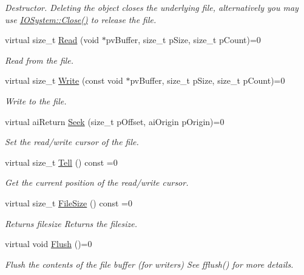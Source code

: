 \begin{DoxyCompactItemize}
\begin{DoxyCompactList}\small\item\em \-Destructor. \-Deleting the object closes the underlying file, alternatively you may use \hyperlink{classAssimp_1_1IOSystem_a8c334d60f04bceeb6bd0157d21723f3e}{\-I\-O\-System\-::\-Close()} to release the file. \end{DoxyCompactList}\item 
virtual size\-\_\-t \hyperlink{classAssimp_1_1IOStream_ae376f641020989d61863b9c6f55c7abf}{\-Read} (void $\ast$pv\-Buffer, size\-\_\-t p\-Size, size\-\_\-t p\-Count)=0
\begin{DoxyCompactList}\small\item\em \-Read from the file. \end{DoxyCompactList}\item 
virtual size\-\_\-t \hyperlink{classAssimp_1_1IOStream_ad0ca4aae1b8c4d00db391ac3a4171f7b}{\-Write} (const void $\ast$pv\-Buffer, size\-\_\-t p\-Size, size\-\_\-t p\-Count)=0
\begin{DoxyCompactList}\small\item\em \-Write to the file. \end{DoxyCompactList}\item 
virtual ai\-Return \hyperlink{classAssimp_1_1IOStream_a5ed0dddf418ab08cf3fc21f3f3032220}{\-Seek} (size\-\_\-t p\-Offset, ai\-Origin p\-Origin)=0
\begin{DoxyCompactList}\small\item\em \-Set the read/write cursor of the file. \end{DoxyCompactList}\item 
virtual size\-\_\-t \hyperlink{classAssimp_1_1IOStream_a316ac6cd16b5a493d1313f792c806194}{\-Tell} () const =0
\begin{DoxyCompactList}\small\item\em \-Get the current position of the read/write cursor. \end{DoxyCompactList}\item 
\hypertarget{classAssimp_1_1IOStream_aaa01183d197fb714f28d6c611b6fa058}{virtual size\-\_\-t \hyperlink{classAssimp_1_1IOStream_aaa01183d197fb714f28d6c611b6fa058}{\-File\-Size} () const =0}\label{classAssimp_1_1IOStream_aaa01183d197fb714f28d6c611b6fa058}

\begin{DoxyCompactList}\small\item\em \-Returns filesize \-Returns the filesize. \end{DoxyCompactList}\item 
\hypertarget{classAssimp_1_1IOStream_a7c19952446ece90924b246f087417899}{virtual void \hyperlink{classAssimp_1_1IOStream_a7c19952446ece90924b246f087417899}{\-Flush} ()=0}\label{classAssimp_1_1IOStream_a7c19952446ece90924b246f087417899}

\begin{DoxyCompactList}\small\item\em \-Flush the contents of the file buffer (for writers) \-See fflush() for more details. \end{DoxyCompactList}\end{DoxyCompactItemize}
